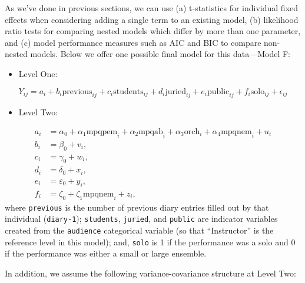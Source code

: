 \documentclass[
]{krantz}
\providecommand{\tightlist}{%
  \setlength{\itemsep}{0pt}\setlength{\parskip}{0pt}}
\begin{document}
As we've done in previous sections, we can use (a) t-statistics for individual fixed effects when considering adding a single term to an existing model, (b) likelihood ratio tests for comparing nested models which differ by more than one parameter, and (c) model performance measures such as AIC and BIC to compare non-nested models. Below we offer one possible final model for this data---Model F:

\begin{itemize}
\tightlist
\item
  Level One:
\end{itemize}

\begin{equation*}
Y_{ij} = a_{i}+b_{i}\textrm{previous}_{ij}+c_{i}\textrm{students}_{ij}+
d_{i}\textrm{juried}_{ij}+e_{i}\textrm{public}_{ij}+f_{i}\textrm{solo}_{ij}+\epsilon_{ij}
\end{equation*}

\begin{itemize}
\tightlist
\item
  Level Two:
\end{itemize}

\begin{align*}
a_{i} & = \alpha_{0}+\alpha_{1}\textrm{mpqpem}_{i}+\alpha_{2}\textrm{mpqab}_{i} + \alpha_{3}\textrm{orch}_{i}+\alpha_{4}\textrm{mpqnem}_{i}+u_{i} \\
b_{i} & = \beta_{0}+v_{i}, \\
c_{i} & = \gamma_{0}+w_{i}, \\
d_{i} & = \delta_{0}+x_{i}, \\
e_{i} & = \varepsilon_{0}+y_{i}, \\
f_{i} & = \zeta_{0}+\zeta_{1}\textrm{mpqnem}_{i}+z_{i},
\end{align*}
where \texttt{previous} is the number of previous diary entries filled out by that individual (\texttt{diary-1}); \texttt{students}, \texttt{juried}, and \texttt{public} are indicator variables created from the \texttt{audience} categorical variable (so that ``Instructor'' is the reference level in this model); and, \texttt{solo} is 1 if the performance was a solo and 0 if the performance was either a small or large ensemble.

In addition, we assume the following variance-covariance structure at Level Two:
\end{document}
